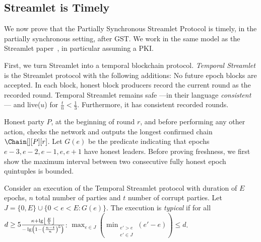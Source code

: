 \subsection{Streamlet is Timely}

We now prove that the Partially Synchronous Streamlet Protocol is timely,
in the partially synchronous setting, after GST.
We work in the same model as the Streamlet paper~\cite{streamlet},
in particular assuming a PKI.

First, we turn Streamlet into a temporal blockchain protocol.
\emph{Temporal Streamlet} is the Streamlet protocol with the
following additions: No future epoch blocks are accepted. In each block, honest block producers
record the current round as the recorded round.
Temporal Streamlet remains safe ---in their language \emph{consistent}--- and live($u$)
for $\frac{t}{n} < \frac{1}{3}$. Furthermore, it has consistent recorded rounds.

Honest party $P$, at the beginning of round $r$, and
before performing any other action, checks the network and
outputs the longest confirmed chain $\Chain[][P][r]$.
Let $G(e)$ be the predicate indicating that epochs $e-3,e-2,e-1,e,e+1$ have honest leaders.
Before proving freshness, we first show the maximum interval between two consecutive fully
honest epoch quintuples is bounded.

\begin{definition}
  Consider an execution of the Temporal Streamlet protocol with duration
  of $E$ epochs, $n$ total number of parties and $t$ number of corrupt parties.
  Let $J = \{0,E\} \cup \{0 < e < E: G(e)\}$.
  The execution is \emph{typical} if for all
  $d \geq 5\frac{\kappa + \lg \floor*{\frac{E}{5}}}{- \lg \left(1 - \left(\frac{n - t}{n}\right)^5\right)}$:
  $\max_{e \in J}(\min_{\substack{e' > e \\ e' \in J}}(e' - e)) \leq d$.
\end{definition}

